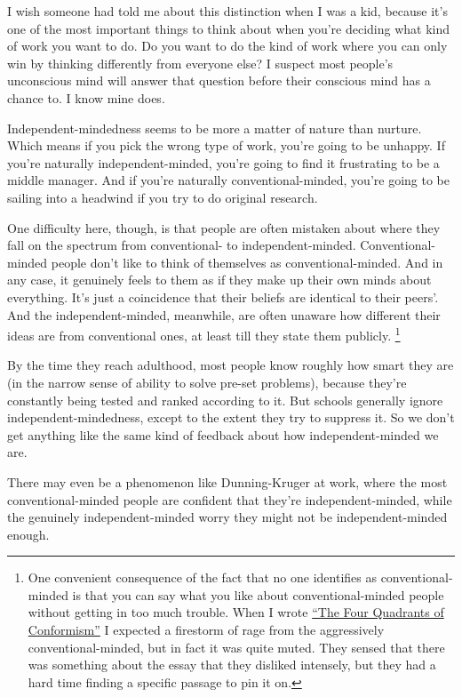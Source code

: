 \documentclass[12pt]{book}
\begin{document}
I wish someone had told me about this distinction when I was a kid,
because it's one of the most important things to think about when you're
deciding what kind of work you want to do. Do you want to do the kind of
work where you can only win by thinking differently from everyone else?
I suspect most people's unconscious mind will answer that question
before their conscious mind has a chance to. I know mine does.

Independent-mindedness seems to be more a matter of nature than nurture.
Which means if you pick the wrong type of work, you're going to be
unhappy. If you're naturally independent-minded, you're going to find it
frustrating to be a middle manager. And if you're naturally
conventional-minded, you're going to be sailing into a headwind if you
try to do original research.

One difficulty here, though, is that people are often mistaken about
where they fall on the spectrum from conventional- to
independent-minded. Conventional-minded people don't like to think of
themselves as conventional-minded. And in any case, it genuinely feels
to them as if they make up their own minds about everything. It's just a
coincidence that their beliefs are identical to their peers'. And the
independent-minded, meanwhile, are often unaware how different their
ideas are from conventional ones, at least till they state them
publicly. \footnote{One convenient consequence of the fact that no one identifies as
conventional-minded is that you can say what you like about
conventional-minded people without getting in too much trouble. When I
wrote \href{conformism.html}{``The Four Quadrants of Conformism''} I
expected a firestorm of rage from the aggressively conventional-minded,
but in fact it was quite muted. They sensed that there was something
about the essay that they disliked intensely, but they had a hard time
finding a specific passage to pin it on.}

By the time they reach adulthood, most people know roughly how smart
they are (in the narrow sense of ability to solve pre-set problems),
because they're constantly being tested and ranked according to it. But
schools generally ignore independent-mindedness, except to the extent
they try to suppress it. So we don't get anything like the same kind of
feedback about how independent-minded we are.

There may even be a phenomenon like Dunning-Kruger at work, where the
most conventional-minded people are confident that they're
independent-minded, while the genuinely independent-minded worry they
might not be independent-minded enough.
\end{document}
